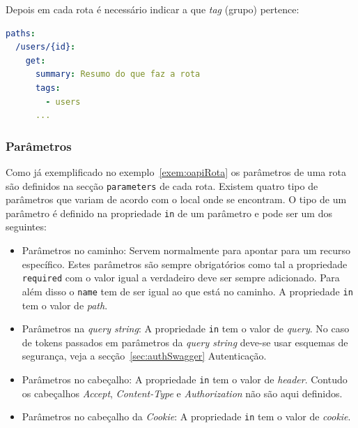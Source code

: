 Depois em cada rota é necessário indicar a que \textit{tag} (grupo) pertence:
\begin{lstlisting}[language=yaml, caption=Exemplo de uso de \textit{tags} numa rota na especificação \textit{OpenAPI}]
paths:
  /users/{id}:
    get:
      summary: Resumo do que faz a rota
      tags:
        - users
      ...
\end{lstlisting}

\vspace{-0.7cm}

\subsubsection{Parâmetros}\label{sec:paramSwagger}
Como já exemplificado no exemplo~\ref{exem:oapiRota} os parâmetros de uma rota são definidos na secção \texttt{parameters} de cada rota. Existem quatro tipo de parâmetros que variam de acordo com o local onde se encontram. O tipo de um parâmetro é definido na propriedade \texttt{in} de um parâmetro e pode ser um dos seguintes:
\begin{itemize}
    \item Parâmetros no caminho: Servem normalmente para apontar para um recurso específico. Estes parâmetros são sempre obrigatórios como tal a propriedade \texttt{required} com o valor igual a verdadeiro deve ser sempre adicionado. Para além disso o \texttt{name} tem de ser igual ao que está no caminho. A propriedade \texttt{in} tem o valor de \textit{path}.
    \item Parâmetros na \textit{query string}: A propriedade \texttt{in} tem o valor de \textit{query}. No caso de tokens passados em parâmetros da \textit{query string} deve-se usar esquemas de segurança, veja a secção~\ref{sec:authSwagger} Autenticação.
    \item Parâmetros no cabeçalho: A propriedade \texttt{in} tem o valor de \textit{header}. Contudo os cabeçalhos \textit{Accept}, \textit{Content-Type} e \textit{Authorization} não são aqui definidos.
    \item Parâmetros no cabeçalho da \textit{Cookie}: A propriedade \texttt{in} tem o valor de \textit{cookie}.
\end{itemize}

